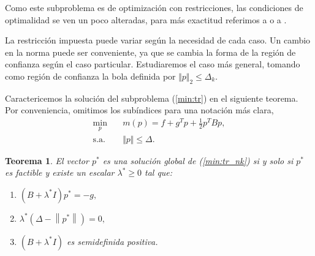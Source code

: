 \documentclass[11pt,a4paper]{book}
\newtheorem{theorem}{Teorema}[chapter]
\theoremstyle{definition}
\theoremstyle{remark}
\newcommand{\norm}[1]{\left\lVert#1\right\rVert}
\begin{document}
Como este subproblema es de optimización con restricciones, las condiciones de optimalidad
se ven un poco alteradas, para más exactitud referimos a \cite[Capítulo 12]{Nocedal2006-kh} o a
\cite[Capítulo 8]{Sun2006-au}.

La restricción impuesta puede variar según la necesidad de cada caso. Un cambio en
la norma puede ser conveniente, ya que se cambia la forma de la región de confianza
según el caso particular. Estudiaremos el caso más general, tomando como región de confianza
la bola definida por 
$\Vert p \Vert_2 \leq \Delta_k$.

Caractericemos la solución del subproblema (\ref{min:tr}) en el siguiente teorema.
Por conveniencia, omitimos los subíndices para una notación más clara,
\begin{equation}
\label{min:tr_nk}
\begin{aligned}
	\min_{p} &\quad  m(p) = f + g^Tp + \frac{1}{2}p^TBp, \\
	\text{s.a.} &\quad  \Vert p \Vert \leq \Delta. 
\end{aligned}
\end{equation}

\begin{theorem} \label{th:trustregion}
	El vector $p^*$ es una solución global de (\ref{min:tr_nk}) si y solo si $p^*$ es factible y existe un escalar $\lambda^* \geq 0$ tal que:
\begin{enumerate}
	\item $(B+\lambda^* I)p^*=-g,$
	\item $\lambda^* (\Delta - \norm{p^*}) = 0,$
	\item $(B+\lambda^* I)$ es semidefinida positiva.
\end{enumerate}
\end{theorem}
\end{document}
